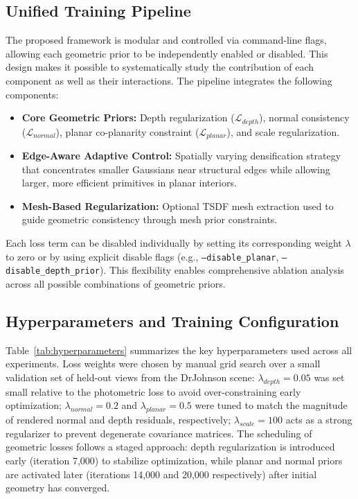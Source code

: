\subsection{Unified Training Pipeline}

The proposed framework is modular and controlled via command-line flags, allowing each geometric prior to be independently enabled or disabled. This design makes it possible to systematically study the contribution of each component as well as their interactions. The pipeline integrates the following components:

\begin{itemize}
    \item \textbf{Core Geometric Priors:} Depth regularization ($\mathcal{L}_{depth}$), normal consistency ($\mathcal{L}_{normal}$), planar co-planarity constraint ($\mathcal{L}_{planar}$), and scale regularization.
    \item \textbf{Edge-Aware Adaptive Control:} Spatially varying densification strategy that concentrates smaller Gaussians near structural edges while allowing larger, more efficient primitives in planar interiors.
    \item \textbf{Mesh-Based Regularization:} Optional TSDF mesh extraction used to guide geometric consistency through mesh prior constraints.
\end{itemize}

Each loss term can be disabled individually by setting its corresponding weight $\lambda$ to zero or by using explicit disable flags (e.g., \texttt{--disable\_\allowbreak planar}, \texttt{--disable\_\allowbreak depth\_\allowbreak prior}). This flexibility enables comprehensive ablation analysis across all possible combinations of geometric priors.

\subsection{Hyperparameters and Training Configuration}

Table~\ref{tab:hyperparameters} summarizes the key hyperparameters used across all experiments. Loss weights were chosen by manual grid search over a small validation set of held-out views from the DrJohnson scene: $\lambda_{depth} = 0.05$ was set small relative to the photometric loss to avoid over-constraining early optimization; $\lambda_{normal} = 0.2$ and $\lambda_{planar} = 0.5$ were tuned to match the magnitude of rendered normal and depth residuals, respectively; $\lambda_{scale} = 100$ acts as a strong regularizer to prevent degenerate covariance matrices. The scheduling of geometric losses follows a staged approach: depth regularization is introduced early (iteration 7,000) to stabilize optimization, while planar and normal priors are activated later (iterations 14,000 and 20,000 respectively) after initial geometry has converged.

